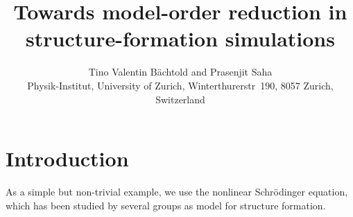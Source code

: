 \documentclass[usenatbib]{mn2e}
\title{Towards model-order reduction in structure-formation simulations}
\author[B\"achtold and Saha]
{Tino Valentin B\"achtold and Prasenjit Saha \\
Physik-Institut, University of Zurich, Winterthurerstr~190, 8057
Zurich, Switzerland \\ }
\date{}
\begin{document}
\maketitle

\begin{abstract}
\end{abstract}

\begin{keywords}

\end{keywords}

\section{Introduction}

As a simple but non-trivial example, we use the nonlinear
Schr\"odinger equation, which has been studied by several groups as
model for structure formation\cite{1993ApJ...416L..71W}.



\def\aap{A\&A}
\def\araa{ARA\&A}
\def\apjl{APJL}
\def\mnras{MNRAS}
\def\nat{Nature}


\end{document}
